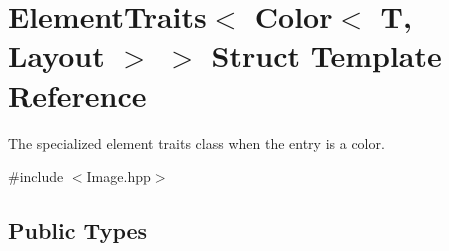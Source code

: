 \hypertarget{struct_d_o_1_1_element_traits_3_01_color_3_01_t_00_01_layout_01_4_01_4}{\section{Element\-Traits$<$ Color$<$ T, Layout $>$ $>$ Struct Template Reference}
\label{struct_d_o_1_1_element_traits_3_01_color_3_01_t_00_01_layout_01_4_01_4}
}


The specialized element traits class when the entry is a color.  




{\ttfamily \#include $<$Image.\-hpp$>$}

\subsection*{Public Types}
